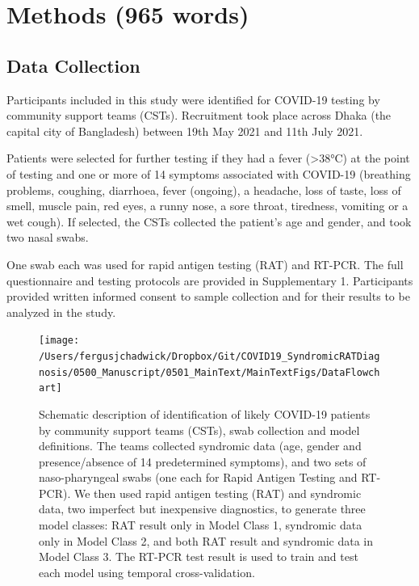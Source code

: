\documentclass[]{elsarticle} %
\begin{document}
\hypertarget{methods-965-words}{%
\section{Methods (965 words)}\label{methods-965-words}}

\hypertarget{data-collection}{%
\subsection{Data Collection}\label{data-collection}}

Participants included in this study were identified for COVID-19 testing by community support teams (CSTs).
Recruitment took place across Dhaka (the capital city of Bangladesh) between 19th May 2021 and 11th July 2021.

Patients were selected for further testing if they had a fever (\textgreater38°C) at the point of testing and one or more of 14 symptoms associated with COVID-19 (breathing problems, coughing, diarrhoea, fever (ongoing), a headache, loss of taste, loss of smell, muscle pain, red eyes, a runny nose, a sore throat, tiredness, vomiting or a wet cough).
If selected, the CSTs collected the patient's age and gender, and took two nasal swabs.

One swab each was used for rapid antigen testing (RAT) and RT-PCR.
The full questionnaire and testing protocols are provided in Supplementary 1.
Participants provided written informed consent to sample collection and for their results to be analyzed in the study.

\begin{figure}
\texttt{[image: /Users/fergusjchadwick/Dropbox/Git/COVID19\_SyndromicRATDiagnosis/0500\_Manuscript/0501\_MainText/MainTextFigs/DataFlowchart]} \caption{Schematic description of identification of likely COVID-19 patients by community support teams (CSTs), swab collection and model definitions. The teams collected syndromic data (age, gender and presence/absence of 14 predetermined symptoms), and two sets of naso-pharyngeal swabs (one each for Rapid Antigen Testing and RT-PCR). We then used rapid antigen testing (RAT) and syndromic data, two imperfect but inexpensive diagnostics, to generate three model classes: RAT result only in Model Class 1, syndromic data only in Model Class 2, and both RAT result and syndromic data in Model Class 3. The RT-PCR test result is used to train and test each model using temporal cross-validation.}\label{fig:data-flowchart}
\end{figure}
\end{document}

